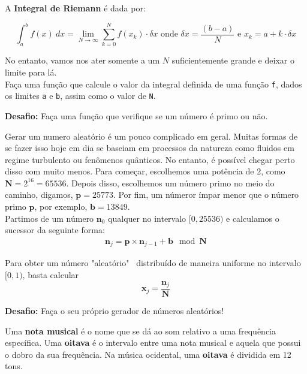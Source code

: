 \documentclass[12pt]{article}
\begin{document}
	
	A \textbf{Integral de Riemann} é dada por:
	
		$$\int_{a}^{b} f(x)\ dx = \lim_{N \to \infty} \sum_{k = 0}^{N} f(x_k) \cdot \delta x \text{ onde } \delta x = \frac{(b - a)}{N} \text{ e } x_k = a + k \cdot \delta x$$
	
	No entanto, vamos nos ater somente a um $N$ suficientemente grande e deixar o limite para lá.\\
	
	\quest Faça uma função que calcule o valor da integral definida de uma função \texttt{f}, dados os limites \texttt{a} e \texttt{b}, assim como o valor de \texttt{N}.
	
	

	
	\textbf{Desafio:} Faça uma função que verifique se um número é primo ou não.

	
	Gerar um numero aleatório é um pouco complicado em geral. Muitas formas de se fazer isso hoje em dia se baseiam em processos da natureza como fluidos em regime turbulento ou fenômenos quânticos. No entanto, é possível chegar perto disso com muito menos. Para começar, escolhemos uma potência de $2$, como $\mathbf{N} = 2^{16} = 65536$. Depois disso, escolhemos um número primo no meio do caminho, digamos, $\mathbf{p} = 25773$. Por fim, um númeror ímpar menor que o número primo $\mathbf{p}$, por exemplo, $\mathbf{b} = 13849$.\\

	Partimos de um número $\mathbf{n}_0$ qualquer no intervalo $[0, 25536)$ e calculamos o sucessor da seguinte forma:
		\begin{align*}
			\mathbf{n}_j = \mathbf{p} \times \mathbf{n}_{j-1} + \mathbf{b} \mod \mathbf{N}
		\end{align*}

	Para obter um número "aleatório"~ distribuído de maneira uniforme no intervalo $[0, 1)$, basta calcular
		$$\mathbf{x}_j = \frac{\mathbf{n}_j}{\mathbf{N}}$$
		
	\textbf{Desafio:} Faça o seu próprio gerador de números aleatórios!
		
	\label{p:musica1}
	
	Uma \textbf{nota musical} é o nome que se dá ao som relativo a uma frequência específica. Uma \textbf{oitava} é o intervalo entre uma nota musical e aquela que possui o dobro da sua frequência. Na música ocidental, uma \textbf{oitava} é dividida em 12 tons.\\
	
\end{document}
